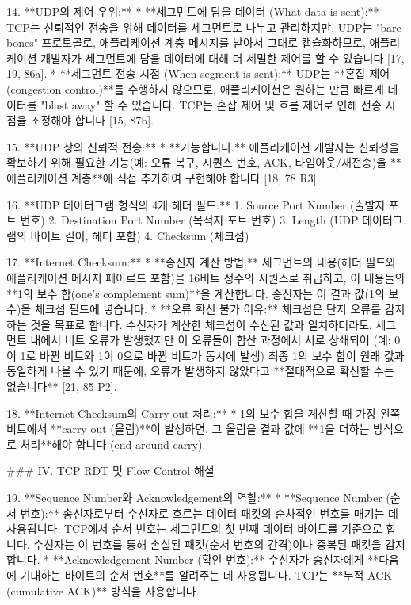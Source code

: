 14. **UDP의 제어 우위:**
    *   **세그먼트에 담을 데이터 (What data is sent):** TCP는 신뢰적인 전송을 위해 데이터를 세그먼트로 나누고 관리하지만, UDP는 "bare bones" 프로토콜로, 애플리케이션 계층 메시지를 받아서 그대로 캡슐화하므로, 애플리케이션 개발자가 세그먼트에 담을 데이터에 대해 더 세밀한 제어를 할 수 있습니다 [17, 19, 86a].
    *   **세그먼트 전송 시점 (When segment is sent):** UDP는 **혼잡 제어(congestion control)**를 수행하지 않으므로, 애플리케이션은 원하는 만큼 빠르게 데이터를 "blast away" 할 수 있습니다. TCP는 혼잡 제어 및 흐름 제어로 인해 전송 시점을 조정해야 합니다 [15, 87b].

15. **UDP 상의 신뢰적 전송:**
    *   **가능합니다.** 애플리케이션 개발자는 신뢰성을 확보하기 위해 필요한 기능(예: 오류 복구, 시퀀스 번호, ACK, 타임아웃/재전송)을 **애플리케이션 계층**에 직접 추가하여 구현해야 합니다 [18, 78 R3].

16. **UDP 데이터그램 형식의 4개 헤더 필드:**
    1.  Source Port Number (출발지 포트 번호)
    2.  Destination Port Number (목적지 포트 번호)
    3.  Length (UDP 데이터그램의 바이트 길이, 헤더 포함)
    4.  Checksum (체크섬)

17. **Internet Checksum:**
    *   **송신자 계산 방법:** 세그먼트의 내용(헤더 필드와 애플리케이션 메시지 페이로드 포함)을 16비트 정수의 시퀀스로 취급하고, 이 내용들의 **1의 보수 합(one’s complement sum)**을 계산합니다. 송신자는 이 결과 값(1의 보수)을 체크섬 필드에 넣습니다.
    *   **오류 확신 불가 이유:** 체크섬은 단지 오류를 감지하는 것을 목표로 합니다. 수신자가 계산한 체크섬이 수신된 값과 일치하더라도, 세그먼트 내에서 비트 오류가 발생했지만 이 오류들이 합산 과정에서 서로 상쇄되어 (예: 0이 1로 바뀐 비트와 1이 0으로 바뀐 비트가 동시에 발생) 최종 1의 보수 합이 원래 값과 동일하게 나올 수 있기 때문에, 오류가 발생하지 않았다고 **절대적으로 확신할 수는 없습니다** [21, 85 P2].

18. **Internet Checksum의 Carry out 처리:**
    *   1의 보수 합을 계산할 때 가장 왼쪽 비트에서 **carry out (올림)**이 발생하면, 그 올림을 결과 값에 **1을 더하는 방식으로 처리**해야 합니다 (end-around carry).

### IV. TCP RDT 및 Flow Control 해설

19. **Sequence Number와 Acknowledgement의 역할:**
    *   **Sequence Number (순서 번호):** 송신자로부터 수신자로 흐르는 데이터 패킷의 순차적인 번호를 매기는 데 사용됩니다. TCP에서 순서 번호는 세그먼트의 첫 번째 데이터 바이트를 기준으로 합니다. 수신자는 이 번호를 통해 손실된 패킷(순서 번호의 간격)이나 중복된 패킷을 감지합니다.
    *   **Acknowledgement Number (확인 번호):** 수신자가 송신자에게 **다음에 기대하는 바이트의 순서 번호**를 알려주는 데 사용됩니다. TCP는 **누적 ACK (cumulative ACK)** 방식을 사용합니다.

